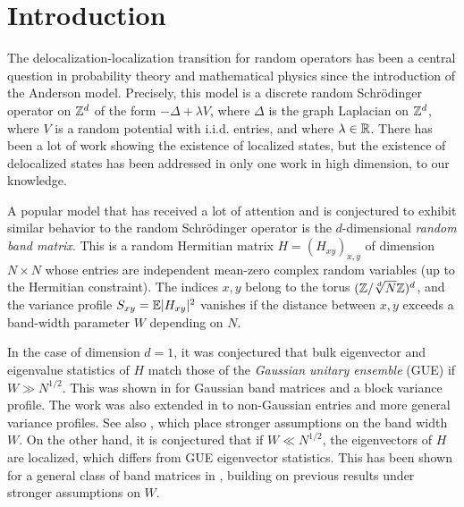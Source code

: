 
\section{Introduction}

The delocalization-localization transition for random operators has been a central question in probability theory and mathematical physics since the introduction of the Anderson model. Precisely, this model is a discrete random Schr\"{o}dinger operator on $\mathbb{Z}^{d}$ of the form $-\Delta+\lambda V$, where $\Delta$ is the graph Laplacian on $\mathbb{Z}^{d}$, where $V$ is a random potential with i.i.d. entries, and where $\lambda\in\mathbb{R}$. There has been a lot of work \cite{FroSpen_1985,Bourgain2005,Carmona1987,DingSmart2020,Damanik2002,Germinet2013,LiZhang2019} showing the existence of localized states, but the existence of delocalized states has been addressed in only one work \cite{yang2024Del} in high dimension, to our knowledge. 

A popular model \cite{PB_review,Spe} that has received a lot of attention and is conjectured to exhibit similar behavior to the random Schr\"{o}dinger operator is the $d$-dimensional \emph{random band matrix}. This is a random Hermitian matrix $H=(H_{xy})_{x,y}$ of dimension $N\times N$ whose entries are independent mean-zero complex random variables (up to the Hermitian constraint). The indices $x,y$ belong to the torus $(\mathbb{Z}/\sqrt[d]{N}\mathbb{Z})^{d}$, and the variance profile $S_{xy}=\mathbb{E}|H_{xy}|^{2}$ vanishes if the distance between $x,y$ exceeds a band-width parameter $W$ depending on $N$.

In the case of dimension $d=1$, it was conjectured that \cite{PhysRevLett.64.1851, PhysRevLett.64.5, PhysRevLett.66.986} bulk eigenvector and eigenvalue statistics of $H$ match those of the \emph{Gaussian unitary ensemble} (GUE) if $W\gg N^{1/2}$. This was shown in \cite{YY_25} for Gaussian band matrices and a block variance profile. {The work \cite{YY_25} was also extended in \cite{ER_25_band} to non-Gaussian entries and more general variance profiles.} See also \cite{BaoErd2015, erdHos2013local, EK_band1,ErdKno2011, HeMa2018,bourgade2017universality, bourgade2019random,bourgade2020random,yang2021random,DY}, which place stronger assumptions on the band width $W$. On the other hand, it is conjectured that if $W \ll N^{1/2}$, the eigenvectors of $H$ are localized, which differs from GUE eigenvector statistics. This has been shown for a general class of band matrices in \cite{D_25}, building on previous results \cite{https://doi.org/10.48550/arxiv.2206.05545, https://doi.org/10.48550/arxiv.2206.06439,Sch2009,PelSchShaSod} under stronger assumptions on $W$.

